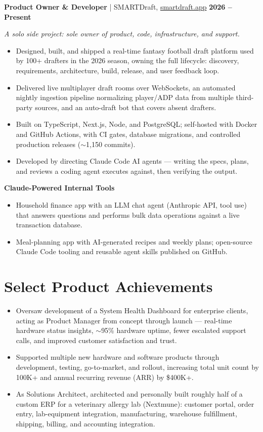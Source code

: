 \documentclass[10pt,letterpaper]{article}
\newcommand{\role}[4]{%
  \vspace{4pt}%
  {\textbf{#2} \textcolor{rulegray}{|} #1 \hfill \textbf{#3}}\par
  {\small\itshape #4\par}}
\newenvironment{roleblock}{\par\begin{minipage}{\textwidth}}{\end{minipage}\par\vspace{7pt}}
\begin{document}
\begin{roleblock}
\role{SMARTDraft, \href{https://smartdraft.app}{smartdraft.app}}{Product Owner \& Developer}{2026 -- Present}
{A solo side project: sole owner of product, code, infrastructure, and support.}
\begin{itemize}
  \item Designed, built, and shipped a real-time fantasy football draft platform used by 100+ drafters in the 2026 season, owning the full lifecycle: discovery, requirements, architecture, build, release, and user feedback loop.
  \item Delivered live multiplayer draft rooms over WebSockets, an automated nightly ingestion pipeline normalizing player/ADP data from multiple third-party sources, and an auto-draft bot that covers absent drafters.
  \item Built on TypeScript, Next.js, Node, and PostgreSQL; self-hosted with Docker and GitHub Actions, with CI gates, database migrations, and controlled production releases ($\sim$1{,}150 commits).
  \item Developed by directing Claude Code AI agents — writing the specs, plans, and reviews a coding agent executes against, then verifying the output.
\end{itemize}
\end{roleblock}

\textbf{Claude-Powered Internal Tools}
\begin{itemize}
  \item Household finance app with an LLM chat agent (Anthropic API, tool use) that answers questions and performs bulk data operations against a live transaction database.
  \item Meal-planning app with AI-generated recipes and weekly plans; open-source Claude Code tooling and reusable agent skills published on GitHub.
\end{itemize}

\section{Select Product Achievements}
\begin{itemize}
  \item Oversaw development of a System Health Dashboard for enterprise clients, acting as Product Manager from concept through launch — real-time hardware status insights, $\sim$95\% hardware uptime, fewer escalated support calls, and improved customer satisfaction and trust.
  \item Supported multiple new hardware and software products through development, testing, go-to-market, and rollout, increasing total unit count by 100K+ and annual recurring revenue (ARR) by \$400K+.
  \item As Solutions Architect, architected and personally built roughly half of a custom ERP for a veterinary allergy lab (Nextmune): customer portal, order entry, lab-equipment integration, manufacturing, warehouse fulfillment, shipping, billing, and accounting integration.
\end{itemize}
\end{document}
